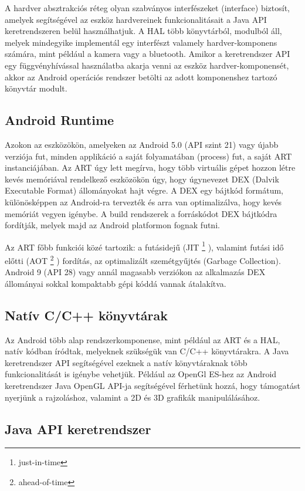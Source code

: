 A hardver absztrakciós réteg olyan szabványos interfészeket (interface) biztosít, amelyek segítségével az eszköz hardvereinek funkcionalitásait a Java API keretrendszeren belül használhatjuk. A HAL több könyvtárból, modulból áll, melyek mindegyike implementál egy interfészt valamely hardver-komponens számára, mint például a kamera vagy a bluetooth. Amikor a keretrendszer API egy függvényhívással használatba akarja venni az eszköz hardver-komponensét, akkor az Android operációs rendszer betölti az adott komponenshez tartozó könyvtár modult.

\subsection{Android Runtime}

Azokon az eszközökön, amelyeken az Android 5.0 (API szint 21) vagy újabb verziója fut, minden applikáció a saját folyamatában (process) fut, a saját ART instanciájában. Az ART úgy lett megírva, hogy több virtuális gépet hozzon létre kevés memóriával rendelkező eszközökön úgy, hogy úgynevezet DEX (Dalvik Executable Format) állományokat hajt végre. A DEX egy bájtkód formátum, különösképpen az Android-ra tervezték és arra van optimalizálva, hogy kevés memóriát vegyen igénybe. A build rendszerek a forráskódot DEX bájtkódra fordítják, melyek majd az Android platformon fognak futni.

Az ART főbb funkciói közé tartozik: a futásidejű (JIT%
\footnote{ %
	just-in-time
}  %
), valamint futási idő előtti (AOT%
\footnote{ %
	ahead-of-time
}  %
) fordítás, az optimalizált szemétgyűjtés (Garbage Collection). Android 9 (API 28) vagy annál magasabb verziókon az alkalmazás DEX állományai sokkal kompaktabb gépi kóddá vannak átalakítva.

\subsection{Natív C/C++ könyvtárak}

Az Android több alap rendszerkomponense, mint például az ART és a HAL, natív kódban íródtak, melyeknek szükségük van C/C++ könyvtárakra. A Java keretrendszer API segítségével ezeknek a natív könyvtáraknak több funkcionalitását is igénybe vehetjük. Például az OpenGl ES-hez az Android keretrendszer Java OpenGL API-ja segítségével férhetünk hozzá, hogy támogatást nyerjünk a rajzoláshoz, valamint a 2D és 3D grafikák manipulálásához.

\subsection{Java API keretrendszer}

